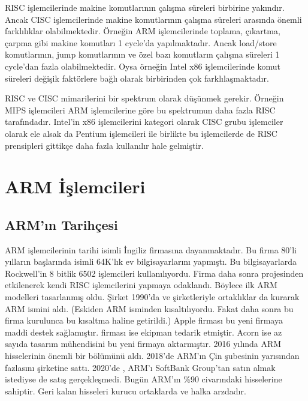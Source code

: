 \documentclass[letterpaper,10pt,turkish]{sphinxmanual}
\begin{document}
\begin{description}
\sphinxAtStartPar
RISC işlemcilerinde makine komutlarının çalışma süreleri birbirine yakındır. Ancak CISC
işlemcilerinde makine komutlarının çalışma süreleri arasında önemli farklılıklar olabilmektedir.
Örneğin ARM işlemcilerinde toplama, çıkartma, çarpma gibi makine komutları 1 cycle’da
yapılmaktadır. Ancak load/store komutlarının, jump komutlarının ve özel bazı komutların çalışma
süreleri 1 cycle’dan fazla olabilmektedir. Oysa örneğin Intel x86 işlemcilerinde komut süreleri
değişik faktörlere bağlı olarak birbirinden çok farklılaşmaktadır.

\end{description}

\sphinxAtStartPar
RISC ve CISC mimarilerini bir spektrum olarak düşünmek gerekir. Örneğin MIPS işlemcileri ARM
işlemcilerine göre bu spektrumun daha fazla RISC tarafındadır. Intel’in x86 işlemcilerini kategori
olarak CISC grubu işlemciler olarak ele alsak da Pentium işlemcileri ile birlikte bu işlemcilerde
de RISC prensipleri gittikçe daha fazla kullanılır hale gelmiştir.


\section{ARM İşlemcileri}
\label{\detokenize{introduction:arm-islemcileri}}

\subsection{ARM’ın Tarihçesi}
\label{\detokenize{introduction:arm-in-tarihcesi}}
\sphinxAtStartPar
ARM işlemcilerinin tarihi  isimli İngiliz firmasına dayanmaktadır. Bu firma
80’li yılların başlarında  isimli 64K’lık ev bilgisayarlarını yapmıştı. Bu bilgisayarlarda
Rockwell’in 8 bitlik 6502 işlemcileri kullanılıyordu. Firma daha sonra  projesinden
etkilenerek kendi RISC işlemcilerini yapmaya odaklandı. Böylece ilk ARM modelleri tasarlanmış oldu.
Şirket 1990’da  ve  şirketleriyle ortaklıklar da kurarak ARM ismini aldı.
(Eskiden ARM  isminden kısaltılıyordu. Fakat daha sonra bu firma kurulunca bu
kısaltma  haline getirildi.) Apple firması bu yeni firmaya maddi destek
sağlamıştır.  firması ise ekipman tedarik etmiştir. Acorn ise az sayıda tasarım
mühendisini bu yeni firmaya aktarmıştır. 2016 yılında  ARM hisselerinin önemli bir
bölümünü aldı. 2018’de ARM’ın Çin şubesinin yarısından fazlasını  şirketine sattı.
2020’de , ARM’ı SoftBank Group’tan satın almak istediyse de satış gerçekleşmedi. Bugün
 ARM’ın \%90 civarındaki hisselerine sahiptir. Geri kalan hisseleri kurucu
ortaklarda ve halka arzdadır.
\end{document}
